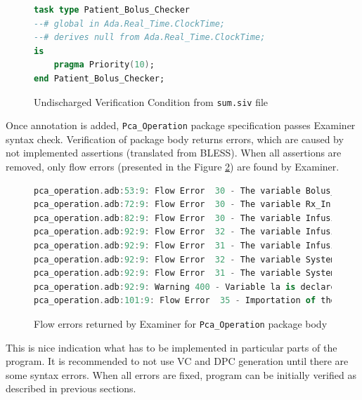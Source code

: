 \begin{figure}
\singlespacing
\begin{lstlisting}[language=ada, frame=single, gobble=0]
task type Patient_Bolus_Checker
--# global in Ada.Real_Time.ClockTime;
--# derives null from Ada.Real_Time.ClockTime;
is
    pragma Priority(10);
end Patient_Bolus_Checker;
\end{lstlisting}
\doublespacing
\caption{Undischarged Verification Condition from \lstinline{sum.siv} file}
\label{listing:verification:pca_generated:patient_bolus_checker}
\end{figure}

Once annotation is added, \lstinline{Pca_Operation} package specification passes Examiner syntax check. Verification of package body returns errors, which are caused by not implemented assertions (translated from BLESS). When all assertions are removed, only flow errors (presented in the Figure \ref{listing:verification:pca_generated:flow_errors}) are found by Examiner. 

\begin{figure}
\singlespacing
\begin{lstlisting}[language=ada, frame=single, gobble=0]
pca_operation.adb:53:9: Flow Error  30 - The variable Bolus_Duration_In is imported but neither referenced nor exported.
pca_operation.adb:72:9: Flow Error  30 - The variable Rx_In is imported but neither referenced nor exported.
pca_operation.adb:82:9: Flow Error  30 - The variable Infusion_Flow_Rate is imported but neither referenced nor exported.
pca_operation.adb:92:9: Flow Error  32 - The variable Infusion_Flow_Rate is neither imported nor defined.
pca_operation.adb:92:9: Flow Error  31 - The variable Infusion_Flow_Rate is exported but not (internally) defined.
pca_operation.adb:92:9: Flow Error  32 - The variable System_Status is neither imported nor defined.
pca_operation.adb:92:9: Flow Error  31 - The variable System_Status is exported but not (internally) defined.
pca_operation.adb:92:9: Warning 400 - Variable la is declared but not used.
pca_operation.adb:101:9: Flow Error  35 - Importation of the initial value of variable Ada.Real_Time.ClockTime is ineffective.
\end{lstlisting}
\doublespacing
\caption{Flow errors returned by Examiner for \lstinline{Pca_Operation} package body}
\label{listing:verification:pca_generated:flow_errors}
\end{figure}

This is nice indication what has to be implemented in particular parts of the program. It is recommended to not use VC and DPC generation until there are some syntax errors. When all errors are fixed, program can be initially verified as described in previous sections.


